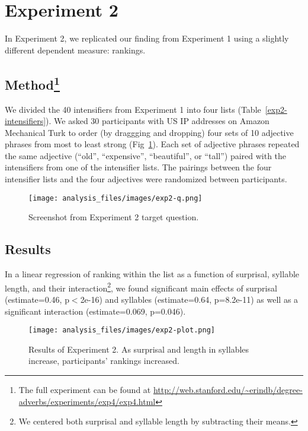 \documentclass[10pt,letterpaper]{article}
\begin{document}
\section{Experiment 2}

In Experiment 2, we replicated our finding from Experiment 1 using a slightly different dependent measure: rankings.

\subsection{Method\footnote{The full experiment can be found at \url{http://web.stanford.edu/~erindb/degree-adverbs/experiments/exp4/exp4.html}}}

We divided the 40 intensifiers from Experiment 1 into four lists (Table~\ref{exp2-intensifiers}). We asked 30 participants with US IP addresses on Amazon Mechanical Turk to order (by draggging and dropping) four sets of 10 adjective phrases from most to least strong (Fig~\ref{exp2-q}). Each set of adjective phrases repeated the same adjective (``old'', ``expensive'', ``beautiful'', or ``tall'') paired with the intensifiers from one of the intensifier lists. The pairings between the four intensifier lists and the four adjectives were randomized between participants.

\begin{figure}[ht]
\begin{center}
\texttt{[image: analysis\_files/images/exp2-q.png]}
\end{center}
\caption{Screenshot from Experiment 2 target question.} 
\label{exp2-q}
\end{figure}

\subsection{Results}

In a linear regression of ranking within the list as a function of surprisal, syllable length, and their interaction\footnote{We centered both surprisal and syllable length by subtracting their means.}, we found significant main effects of surprisal (estimate=0.46, p$<$2e-16) and syllables (estimate=0.64, p=8.2e-11) as well as a significant interaction (estimate=0.069, p=0.046).

\begin{figure}[ht]
\begin{center}
\texttt{[image: analysis\_files/images/exp2-plot.png]}
\end{center}
\caption{Results of Experiment 2. As surprisal and length in syllables increase, participants' rankings increased.} 
\label{exp2-plot}
\end{figure}
\end{document}
